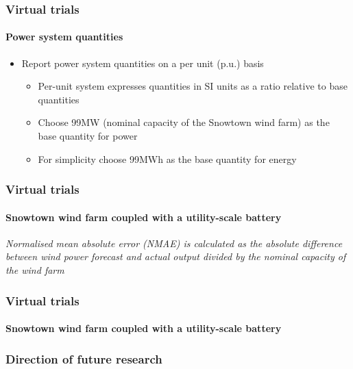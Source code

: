 \documentclass[presentation, smaller, table, svgnames]{beamer}
\begin{document}
\begin{frame}
	\frametitle{Virtual trials}
	\framesubtitle{Power system quantities}

	\begin{itemize}
		\item  Report power system quantities on a per unit (p.u.) basis
		\begin{itemize}
			\item  Per-unit system expresses quantities in SI units as a ratio relative to base quantities
			\item  Choose 99MW (nominal capacity of the Snowtown wind farm) as the base quantity for power   
			\item  For simplicity choose 99MWh as the base quantity for energy
		\end{itemize}
				
	\end{itemize}
	
\end{frame}


\begin{frame}
	\frametitle{Virtual trials}
	\framesubtitle{Snowtown wind farm coupled with a utility-scale battery}

	\begin{figure}[!h]
		\centering
    		\label{fig:disp_wind_bess}
		\scalebox{0.67}{
			
		}
	\end{figure}
	
	{\scriptsize \textit{Normalised mean absolute error (NMAE) is calculated as the absolute difference between wind power forecast and actual output divided by the nominal capacity of the wind farm}
	\par
	}

\end{frame}

\begin{frame}
	\frametitle{Virtual trials}
	\framesubtitle{Snowtown wind farm coupled with a utility-scale battery}


	\begin{figure}[!h]
		\centering
    		\label{fig:disp_wind_bess}
		\scalebox{0.75}{
			
		}
	\end{figure}

\end{frame}


\begin{frame}
	\frametitle{Direction of future research}
	\framesubtitle{}

	
\end{frame}

\end{document}
